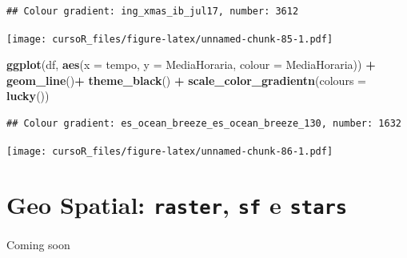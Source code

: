 \documentclass[]{book}
\newenvironment{Shaded}{\begin{snugshade}}{\end{snugshade}}
\newcommand{\KeywordTok}[1]{\textcolor[rgb]{0.13,0.29,0.53}{\textbf{#1}}}
\newcommand{\DataTypeTok}[1]{\textcolor[rgb]{0.13,0.29,0.53}{#1}}
\newcommand{\StringTok}[1]{\textcolor[rgb]{0.31,0.60,0.02}{#1}}
\newcommand{\OperatorTok}[1]{\textcolor[rgb]{0.81,0.36,0.00}{\textbf{#1}}}
\newcommand{\NormalTok}[1]{#1}
\begin{document}
\begin{verbatim}
## Colour gradient: ing_xmas_ib_jul17, number: 3612
\end{verbatim}

\texttt{[image: cursoR\_files/figure-latex/unnamed-chunk-85-1.pdf]}

\begin{Shaded}
\begin{Highlighting}[]
\KeywordTok{ggplot}\NormalTok{(df, }\KeywordTok{aes}\NormalTok{(}\DataTypeTok{x =}\NormalTok{ tempo, }\DataTypeTok{y =}\NormalTok{ MediaHoraria, }\DataTypeTok{colour =}\NormalTok{ MediaHoraria)) }\OperatorTok{+}\StringTok{ }
\StringTok{  }\KeywordTok{geom_line}\NormalTok{()}\OperatorTok{+}
\StringTok{  }\KeywordTok{theme_black}\NormalTok{() }\OperatorTok{+}
\StringTok{  }\KeywordTok{scale_color_gradientn}\NormalTok{(}\DataTypeTok{colours =} \KeywordTok{lucky}\NormalTok{())}
\end{Highlighting}
\end{Shaded}

\begin{verbatim}
## Colour gradient: es_ocean_breeze_es_ocean_breeze_130, number: 1632
\end{verbatim}

\texttt{[image: cursoR\_files/figure-latex/unnamed-chunk-86-1.pdf]}

\chapter{\texorpdfstring{Geo Spatial: \texttt{raster}, \texttt{sf} e
\texttt{stars}}{Geo Spatial: raster, sf e stars}}\label{geo-spatial-raster-sf-e-stars}

Coming soon


\end{document}
